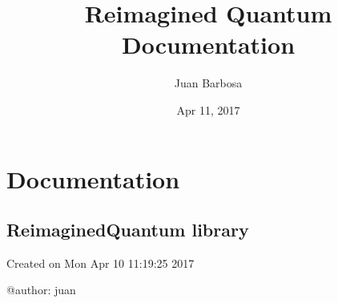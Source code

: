 \documentclass[letterpaper,10pt,english]{sphinxmanual}
\title{Reimagined Quantum Documentation}
\date{Apr 11, 2017}
\author{Juan Barbosa}
\begin{document}
\maketitle
\sphinxtableofcontents
{}\label{\detokenize{index::doc}}



\chapter{Documentation}
\label{\detokenize{code:welcome-to-reimagined-quantum-s-documentation}}\label{\detokenize{code::doc}}\label{\detokenize{code:documentation}}

\section{ReimaginedQuantum library}
\label{\detokenize{code:reimaginedquantum-library}}\label{\detokenize{code:module-reimaginedQuantum}}
Created on Mon Apr 10 11:19:25 2017

@author: juan
\end{document}
